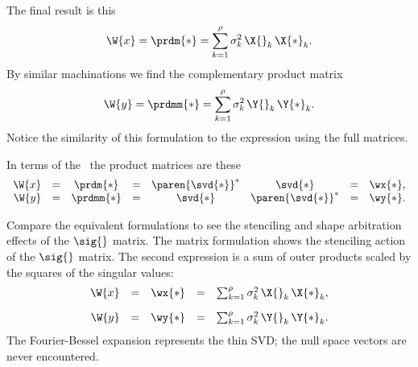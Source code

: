 The final result is this
\begin{equation}
  \W{x} = \prdm{*} = \sum_{k=1}^{\rho}{\sigma_{k}^{2}\,\X{}_{k}\,\X{*}_{k}}.
\end{equation}
By similar machinations we find the complementary product matrix
\begin{equation}
  \W{y} = \prdmm{*} = \sum_{k=1}^{\rho}{\sigma_{k}^{2}\,\Y{}_{k}\,\Y{*}_{k}}.
\end{equation}
Notice the similarity of this formulation to the expression using the full matrices.

In terms of the \svdl \ the product matrices are these
\begin{equation}
  \begin{array}{rccccccl}
    \W{x} &=& \prdm{*}  &=& \paren{\svd{*}}^{*}&\svd{*} &=& \wx{*},\\
    \W{y} &=& \prdmm{*} &=& \svd{*}&\paren{\svd{*}}^{*} &=& \wy{*}.
  \end{array}
\end{equation}

Compare the equivalent formulations to see the stenciling and shape arbitration effects of the $\sig{}$ matrix. The matrix formulation shows the stenciling action of the $\sig{}$ matrix. The second expression is a sum of outer products scaled by the squares of the singular values:
\begin{equation}
  \begin{array}{rcccc}
    \W{x} &=& \wx{*} &=& \sum_{k=1}^{\rho}{\sigma_{k}^{2}\,\X{}_{k}\,\X{*}_{k}},\\[10pt]
    \W{y} &=& \wy{*} &=& \sum_{k=1}^{\rho}{\sigma_{k}^{2}\,\Y{}_{k}\,\Y{*}_{k}}.
  \end{array}
\end{equation}
The Fourier-Bessel expansion represents the thin SVD; the null space vectors are never encountered.

\endinput